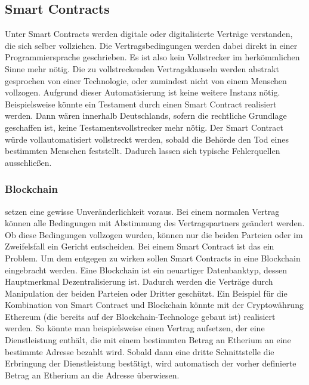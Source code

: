 \subsection{Smart Contracts}
\label{SmartContracts}
Unter Smart Contracts werden digitale oder digitalisierte Verträge verstanden, die sich selber vollziehen. Die Vertragsbedingungen werden dabei direkt in einer Programmiersprache geschrieben. Es ist also kein Vollstrecker im herkömmlichen Sinne mehr nötig. Die zu vollstreckenden Vertragsklauseln werden abstrakt gesprochen von einer Technologie, oder zumindest nicht von einem Menschen vollzogen. Aufgrund dieser Automatisierung ist keine weitere Instanz nötig. Beispielsweise könnte ein Testament durch einen Smart Contract realisiert werden. Dann wären innerhalb Deutschlands, sofern die rechtliche Grundlage geschaffen ist, keine Testamentsvollstrecker mehr nötig. Der Smart Contract würde vollautomatisiert vollstreckt werden, sobald die Behörde den Tod eines bestimmten Menschen feststellt. Dadurch lassen sich typische Fehlerquellen ausschließen.
\subsubsection{Blockchain}
 setzen eine gewisse Unveränderlichkeit voraus. Bei einem normalen Vertrag können alle Bedingungen mit Abstimmung des Vertragspartners geändert werden. Ob diese Bedingungen vollzogen wurden, können nur die beiden Parteien oder im Zweifelsfall ein Gericht entscheiden. Bei einem Smart Contract ist das ein Problem. Um dem entgegen zu wirken sollen Smart Contracts in eine Blockchain eingebracht werden. Eine Blockchain ist ein neuartiger Datenbanktyp, dessen Hauptmerkmal Dezentralisierung ist. Dadurch werden die Verträge durch Manipulation der beiden Parteien oder Dritter geschützt. Ein Beispiel für die Kombination von Smart Contract und Blockchain könnte mit der Cryptowährung Ethereum (die bereits auf der Blockchain-Technologe gebaut ist) realisiert werden. So könnte man beispielsweise einen Vertrag aufsetzen, der eine Dienstleistung enthält, die mit einem bestimmten Betrag an Etherium an eine bestimmte Adresse bezahlt wird. Sobald dann eine dritte Schnittstelle die Erbringung der Dienstleistung bestätigt, wird automatisch der vorher definierte Betrag an Etherium an die Adresse überwiesen. 
